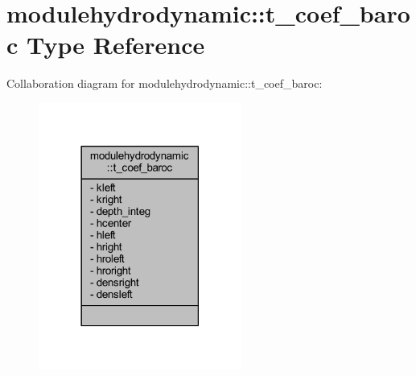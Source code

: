 \hypertarget{structmodulehydrodynamic_1_1t__coef__baroc}{}\section{modulehydrodynamic\+:\+:t\+\_\+coef\+\_\+baroc Type Reference}
\label{structmodulehydrodynamic_1_1t__coef__baroc}


Collaboration diagram for modulehydrodynamic\+:\+:t\+\_\+coef\+\_\+baroc\+:\nopagebreak
\begin{figure}[H]
\begin{center}
\leavevmode
\includegraphics[width=189pt]{structmodulehydrodynamic_1_1t__coef__baroc__coll__graph}
\end{center}
\end{figure}
